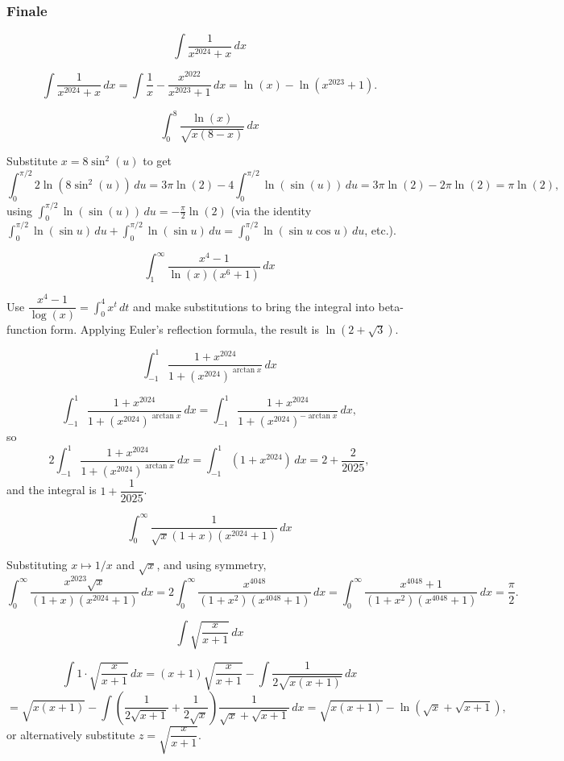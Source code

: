 \subsubsection*{Finale}
\begin{questions}

\question
\[ \int \frac{1}{x^{2024}+x}\, dx \]
\begin{solution}
\[ \int \frac{1}{x^{2024}+x}\, dx = \int \frac{1}{x} - \frac{x^{2022}}{x^{2023}+1}\, dx = \ln(x) - \ln(x^{2023}+1). \]
\end{solution}

\question
\[ \int_0^8 \frac{\ln(x)}{\sqrt{x(8-x)}}\, dx \]
\begin{solution}
Substitute $x=8\sin^2(u)$ to get
\[ \int_0^{\pi/2} 2\ln(8\sin^2(u))\, du = 3\pi\ln(2) - 4\int_0^{\pi/2}\ln(\sin(u))\, du = 3\pi\ln(2)-2\pi\ln(2) = \pi\ln(2), \]
using $\displaystyle\int_0^{\pi/2}\ln(\sin(u))\, du = -\frac{\pi}{2}\ln(2)$ (via the identity $\int_0^{\pi/2}\ln(\sin u)\,du + \int_0^{\pi/2}\ln(\sin u)\,du = \int_0^{\pi/2}\ln(\sin u\cos u)\,du$, etc.).
\end{solution}

\question
\[ \int_1^\infty \frac{x^4-1}{\ln(x)(x^6+1)}\, dx \]
\begin{solution}
Use $\dfrac{x^4-1}{\log(x)} = \displaystyle\int_0^4 x^t\, dt$ and make substitutions to bring the integral into beta-function form. Applying Euler's reflection formula, the result is $\ln(2+\sqrt{3})$.
\end{solution}

\question
\[ \int_{-1}^1 \frac{1+x^{2024}}{1+(x^{2024})^{\arctan x}}\, dx \]
\begin{solution}
\[ \int_{-1}^1 \frac{1+x^{2024}}{1+(x^{2024})^{\arctan x}}\, dx = \int_{-1}^1 \frac{1+x^{2024}}{1+(x^{2024})^{-\arctan x}}\, dx, \]
so
\[ 2\int_{-1}^1 \frac{1+x^{2024}}{1+(x^{2024})^{\arctan x}}\, dx = \int_{-1}^1 (1+x^{2024})\, dx = 2+\frac{2}{2025}, \]
and the integral is $1+\dfrac{1}{2025}$.
\end{solution}

\question
\[ \int_0^\infty \frac{1}{\sqrt{x}(1+x)(x^{2024}+1)}\, dx \]
\begin{solution}
Substituting $x\mapsto 1/x$ and $\sqrt{x}$, and using symmetry,
\[ \int_0^\infty \frac{x^{2023}\sqrt{x}}{(1+x)(x^{2024}+1)}\, dx = 2\int_0^\infty \frac{x^{4048}}{(1+x^2)(x^{4048}+1)}\, dx = \int_0^\infty \frac{x^{4048}+1}{(1+x^2)(x^{4048}+1)}\, dx = \frac{\pi}{2}. \]
\end{solution}

\question[Tiebreaker]
\[ \int \sqrt{\frac{x}{x+1}}\, dx \]
\begin{solution}
\[ \int 1\cdot\sqrt{\frac{x}{x+1}}\, dx = (x+1)\sqrt{\frac{x}{x+1}} - \int \frac{1}{2\sqrt{x(x+1)}}\, dx \]
\[ = \sqrt{x(x+1)} - \int \left(\frac{1}{2\sqrt{x+1}}+\frac{1}{2\sqrt{x}}\right)\frac{1}{\sqrt{x}+\sqrt{x+1}}\, dx = \sqrt{x(x+1)} - \ln(\sqrt{x}+\sqrt{x+1}), \]
or alternatively substitute $z=\sqrt{\dfrac{x}{x+1}}$.
\end{solution}

\end{questions}


